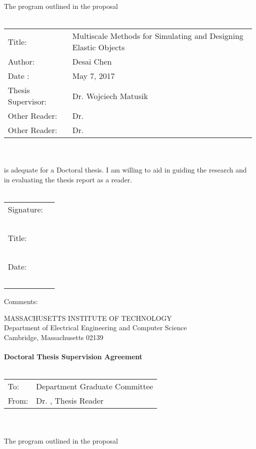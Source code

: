 \documentclass[11pt]{article}
\begin{document}
The program outlined in the proposal\\~\\
\begin{tabular}{p{4cm} l}
	Title: & Multiscale Methods for Simulating and Designing Elastic Objects\\
	Author: & Desai Chen\\
	Date : & May 7, 2017 \\
	Thesis Supervisor: & Dr. Wojciech Matusik\\
	Other Reader: & Dr.\\
	Other Reader: & Dr.
\end{tabular}\\~\\
is adequate for a Doctoral thesis. I am willing to aid in guiding the research and in
evaluating the thesis report as a reader.\\~\\
\begin{flushright}
	\begin{tabular}{l l}
		Signature: & \underline{\hspace{6cm}}\\~\\
		Title: & \underline{\hspace{6cm}}\\~\\
		Date: & \underline{\hspace{6cm}}\\~\\
	\end{tabular}
\end{flushright}
Comments:
\newpage
\begin{center}
	MASSACHUSETTS INSTITUTE OF TECHNOLOGY\\
	Department of Electrical Engineering and Computer Science\\
	Cambridge, Massachusetts 02139\\~\\
	\textbf{Doctoral Thesis Supervision Agreement}\\~\\
\end{center}
\begin{tabular}{p{2cm} p{10cm}}
	To: & Department Graduate Committee \\
	From: & Dr. , Thesis Reader
\end{tabular}\\~\\
The program outlined in the proposal\\~\\
\end{document}
